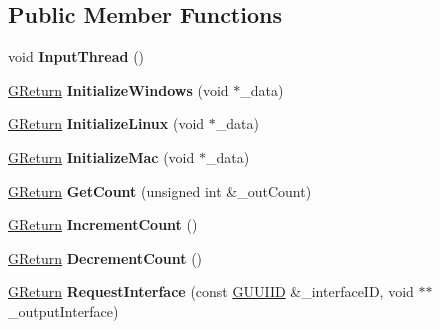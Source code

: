 \subsection*{Public Member Functions}
\begin{DoxyCompactItemize}
\item 
void {\bfseries Input\+Thread} ()\hypertarget{classBufferedInput_a198931e0dc2e54a301b016fc51c5f7e5}{}\label{classBufferedInput_a198931e0dc2e54a301b016fc51c5f7e5}

\item 
\hyperlink{namespaceGW_a67a839e3df7ea8a5c5686613a7a3de21}{G\+Return} {\bfseries Initialize\+Windows} (void $\ast$\+\_\+data)\hypertarget{classBufferedInput_ab8594ef04a6bf4100b835c6ff8199d76}{}\label{classBufferedInput_ab8594ef04a6bf4100b835c6ff8199d76}

\item 
\hyperlink{namespaceGW_a67a839e3df7ea8a5c5686613a7a3de21}{G\+Return} {\bfseries Initialize\+Linux} (void $\ast$\+\_\+data)\hypertarget{classBufferedInput_ad82e212f6f9cef33ed3255cae15eaae7}{}\label{classBufferedInput_ad82e212f6f9cef33ed3255cae15eaae7}

\item 
\hyperlink{namespaceGW_a67a839e3df7ea8a5c5686613a7a3de21}{G\+Return} {\bfseries Initialize\+Mac} (void $\ast$\+\_\+data)\hypertarget{classBufferedInput_a18b419bcd05afc3cf306a2f3851d0c0f}{}\label{classBufferedInput_a18b419bcd05afc3cf306a2f3851d0c0f}

\item 
\hyperlink{namespaceGW_a67a839e3df7ea8a5c5686613a7a3de21}{G\+Return} {\bfseries Get\+Count} (unsigned int \&\+\_\+out\+Count)\hypertarget{classBufferedInput_af98a80ccd4b851192264e37aad15c3ab}{}\label{classBufferedInput_af98a80ccd4b851192264e37aad15c3ab}

\item 
\hyperlink{namespaceGW_a67a839e3df7ea8a5c5686613a7a3de21}{G\+Return} {\bfseries Increment\+Count} ()\hypertarget{classBufferedInput_a022aa95811f5426fe68ba04bbbefb413}{}\label{classBufferedInput_a022aa95811f5426fe68ba04bbbefb413}

\item 
\hyperlink{namespaceGW_a67a839e3df7ea8a5c5686613a7a3de21}{G\+Return} {\bfseries Decrement\+Count} ()\hypertarget{classBufferedInput_a74ca447adf3838cbea5c8e42e440a300}{}\label{classBufferedInput_a74ca447adf3838cbea5c8e42e440a300}

\item 
\hyperlink{namespaceGW_a67a839e3df7ea8a5c5686613a7a3de21}{G\+Return} {\bfseries Request\+Interface} (const \hyperlink{structGW_1_1GUUIID}{G\+U\+U\+I\+ID} \&\+\_\+interface\+ID, void $\ast$$\ast$\+\_\+output\+Interface)\hypertarget{classBufferedInput_a31065a70d0fb3fca9f458e7dd25c5df7}{}\label{classBufferedInput_a31065a70d0fb3fca9f458e7dd25c5df7}


\end{DoxyCompactItemize}
